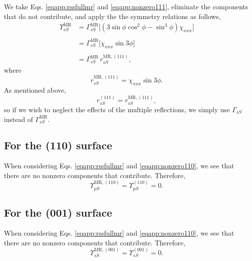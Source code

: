 We take Eqs. \eqref{eqapp:rssfullmr} and \eqref{eqapp:nonzero111}, eliminate the
components that do not contribute, and apply the the symmetry relations as
follows,
\begin{equation*}
\begin{split}
\Upsilon^{\mathrm{MR}}_{sS} &= 
\Gamma^{\mathrm{MR}}_{sS}
\big[
(3\sin\phi\cos^{2}\phi - \sin^{3}\phi)\chi_{xxx}
\big]\\\\
&= 
\Gamma^{\mathrm{MR}}_{sS}
\big[
\chi_{xxx}\sin3\phi
\big]\\\\
&= \Gamma^{\mathrm{MR}}_{sS}\,r^{\mathrm{MR},(111)}_{sS},
\end{split}
\end{equation*}
where
\begin{equation}\label{eqapp:final-rss.mr.111}
r^{\mathrm{MR},(111)}_{sS} = \chi_{xxx}\sin3\phi.
\end{equation}
As mentioned above,
\begin{equation}\label{eqapp:final-rss.111}
r^{(111)}_{sS} = r^{\mathrm{MR},(111)}_{sS},
\end{equation}
so if we wish to neglect the effects of the multiple reflections, we simply use
$\Gamma_{sS}$ instead of $\Gamma^{\mathrm{MR}}_{sS}$.


\subsection{For the (110) surface}

When considering Eqs. \eqref{eqapp:rssfullmr} and \eqref{eqapp:nonzero110}, we see
that there are no nonzero components that contribute. Therefore,
\begin{equation}\label{eqapp:final-rss.mr.110}
\Upsilon^{\mathrm{MR},(110)}_{pS} = \Upsilon^{(110)}_{pS} = 0.
\end{equation}


\subsection{For the (001) surface}

When considering Eqs. \eqref{eqapp:rssfullmr} and \eqref{eqapp:nonzero110}, we see
that there are no nonzero components that contribute. Therefore,
\begin{equation}\label{eqapp:final-rss.mr.001}
\Upsilon^{\mathrm{MR},(001)}_{sS} = \Upsilon^{(001)}_{sS} = 0.
\end{equation}


